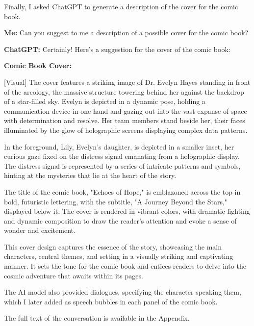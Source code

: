 \documentclass[a4paper,11pt]{article}
\newenvironment{shadedquotation1}
    {\colorlet{shadecolor}{JungleGreen!15}\begin{shaded*}
    \quoting[leftmargin=1cm, rightmargin=1cm, vskip=0pt]
    }
    {\endquoting
    \end{shaded*}
}
\begin{document}
Finally, I asked ChatGPT to generate a description of the cover for the comic book.
\begin{shadedquotation1}
    \textbf{Me:} Can you suggest to me a description of a possible cover for the comic book?\medskip 

    \textbf{ChatGPT:} Certainly! Here's a suggestion for the cover of the comic book:\medskip

    \noindent\textbf{Comic Book Cover:}\smallskip
    
    [Visual] The cover features a striking image of Dr. Evelyn Hayes standing in front of the arcology, the massive structure towering behind her against the backdrop of a star-filled sky. Evelyn is depicted in a dynamic pose, holding a communication device in one hand and gazing out into the vast expanse of space with determination and resolve. Her team members stand beside her, their faces illuminated by the glow of holographic screens displaying complex data patterns.
    
    In the foreground, Lily, Evelyn's daughter, is depicted in a smaller inset, her curious gaze fixed on the distress signal emanating from a holographic display. The distress signal is represented by a series of intricate patterns and symbols, hinting at the mysteries that lie at the heart of the story.
    
    The title of the comic book, "Echoes of Hope," is emblazoned across the top in bold, futuristic lettering, with the subtitle, "A Journey Beyond the Stars," displayed below it. The cover is rendered in vibrant colors, with dramatic lighting and dynamic composition to draw the reader's attention and evoke a sense of wonder and excitement.\medskip
    
    This cover design captures the essence of the story, showcasing the main characters, central themes, and setting in a visually striking and captivating manner. It sets the tone for the comic book and entices readers to delve into the cosmic adventure that awaits within its pages.
\end{shadedquotation1}

The AI model also provided dialogues, specifying the character speaking them, which I later added as speech bubbles in each panel of the comic book.\medskip

The full text of the conversation is available in the Appendix.
\end{document}

